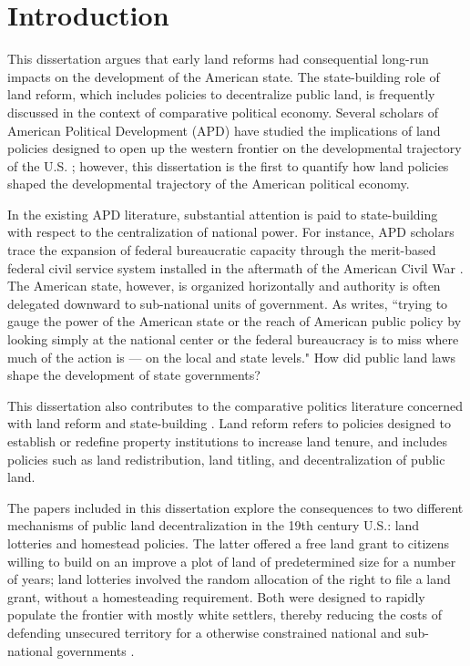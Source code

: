 \chapter{Introduction}

This dissertation argues that early land reforms had consequential long-run impacts on the development of the American state. The state-building role of land reform, which includes policies to decentralize public land, is frequently discussed in the context of comparative political economy. Several scholars of American Political Development (APD) have studied the implications of land policies designed to open up the western frontier on the developmental trajectory of the U.S. \citep[e.g.,][]{bensel1990,frymer2014rush}; however, this dissertation is the first to quantify how land policies shaped the developmental trajectory of the American political economy.

In the existing APD literature, substantial attention is paid to state-building with respect to the centralization of national power.  For instance, APD scholars trace the expansion of federal bureaucratic capacity through the merit-based federal civil service system installed in the aftermath of the American Civil War \citep{skowronek1982building,bensel1990,carpenter2001}. The American state, however, is organized horizontally and authority is often delegated downward to sub-national units of government. As \citet{novak2008myth} writes, ``trying to gauge the power of the American state or the reach of American public policy by looking simply at the national center or the federal bureaucracy is to miss where much of the action is --- on the local and state levels." How did public land laws shape the development of state governments?

This dissertation also contributes to the comparative politics literature concerned with land reform and state-building  \citep[e.g.,][]{albertus2015autocracy, murtazashvili2016does}. Land reform refers to policies designed to establish or redefine property institutions to increase land tenure, and includes policies such as land redistribution, land titling, and decentralization of public land. 

The papers included in this dissertation explore the consequences to two different mechanisms of public land decentralization in the 19th century U.S.: land lotteries and homestead policies. The latter offered a free land grant to citizens willing to build on an improve a plot of land of predetermined size for a number of years; land lotteries involved the random allocation of the right to file a land grant, without a homesteading requirement. Both were designed to rapidly populate the frontier with mostly white settlers, thereby reducing the costs of defending unsecured territory for a otherwise constrained national and sub-national governments \citep{frymer2014rush}.

